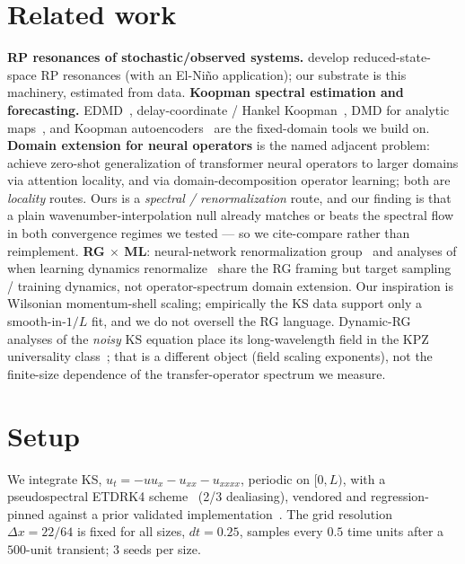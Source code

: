 \documentclass[11pt]{article}
\begin{document}
\section{Related work}
\textbf{RP resonances of stochastic/observed systems.}
\citet{chekroun2020rp1,tantet2020rp2,tantet2020rp3} develop reduced-state-space
RP resonances (with an El-Ni\~no application); our substrate is this machinery,
estimated from data. \textbf{Koopman spectral estimation and forecasting.}
EDMD~\citep{williams2015edmd}, delay-coordinate / Hankel
Koopman~\citep{arbabi2017hankel,das2019delay,mezic2005,takens1981}, DMD for
analytic maps~\citep{slipantschuk2020}, and Koopman
autoencoders~\citep{lusch2018,otto2019,azencot2020} are the fixed-domain tools we
build on. \textbf{Domain extension for neural operators} is the named adjacent
problem: \citet{devilleroche2026zeroshot} achieve zero-shot generalization of
transformer neural operators to larger domains via attention locality, and
\citet{huang2025domain} via domain-decomposition operator learning; both are
\emph{locality} routes. Ours is a \emph{spectral / renormalization} route, and
our finding is that a plain wavenumber-interpolation null already matches or beats
the spectral flow in both convergence regimes we tested --- so we cite-compare
rather than reimplement. \textbf{RG $\times$ ML}:
neural-network renormalization group~\citep{li2018nnrg} and analyses of when
learning dynamics renormalize~\citep{zhang2025renormalize} share the RG framing
but target sampling / training dynamics, not operator-spectrum domain extension.
Our inspiration is Wilsonian momentum-shell scaling; empirically the KS data
support only a smooth-in-$1/L$ fit, and we do not oversell the RG language.
Dynamic-RG analyses of the \emph{noisy} KS equation place its long-wavelength
field in the KPZ universality class~\citep{ueno2005noisyks}; that is a different
object (field scaling exponents), not the finite-size dependence of the
transfer-operator spectrum we measure.

\section{Setup}
\label{sec:setup}
We integrate KS, $u_t = -u u_x - u_{xx} - u_{xxxx}$, periodic on $[0,L)$, with a
pseudospectral ETDRK4 scheme~\citep{kassam2005} (2/3 dealiasing), vendored and
regression-pinned against a prior validated implementation~\citep{howe2026dbar}.
The grid resolution $\Delta x = 22/64$ is fixed for all sizes, $dt=0.25$, samples
every $0.5$ time units after a $500$-unit transient; $3$ seeds per size.
\end{document}
